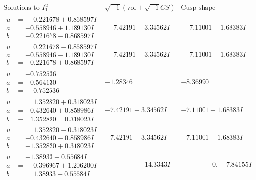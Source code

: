 \documentclass[1p]{elsarticle_modified}
\theoremstyle{definition}
\newcommand{\I}{\sqrt{-1}}
\begin{document}
$$\begin{array}{c|c|c}  
\text{Solutions to }I^u_{1}& \I (\text{vol} + \sqrt{-1}CS) & \text{Cusp shape}\\
 \hline 
\begin{aligned}
u &= \phantom{-}0.221678 + 0.868597 I \\
a &= -0.558946 + 1.189130 I \\
b &= -0.221678 - 0.868597 I\end{aligned}
 & \phantom{-}7.42191 + 3.34562 I & \phantom{-}7.11001 - 1.68383 I \\ \hline\begin{aligned}
u &= \phantom{-}0.221678 - 0.868597 I \\
a &= -0.558946 - 1.189130 I \\
b &= -0.221678 + 0.868597 I\end{aligned}
 & \phantom{-}7.42191 - 3.34562 I & \phantom{-}7.11001 + 1.68383 I \\ \hline\begin{aligned}
u &= -0.752536\phantom{ +0.000000I} \\
a &= -0.564130\phantom{ +0.000000I} \\
b &= \phantom{-}0.752536\phantom{ +0.000000I}\end{aligned}
 & -1.28346\phantom{ +0.000000I} & -8.36990\phantom{ +0.000000I} \\ \hline\begin{aligned}
u &= \phantom{-}1.352820 + 0.318023 I \\
a &= -0.432640 + 0.858986 I \\
b &= -1.352820 - 0.318023 I\end{aligned}
 & -7.42191 - 3.34562 I & -7.11001 + 1.68383 I \\ \hline\begin{aligned}
u &= \phantom{-}1.352820 - 0.318023 I \\
a &= -0.432640 - 0.858986 I \\
b &= -1.352820 + 0.318023 I\end{aligned}
 & -7.42191 + 3.34562 I & -7.11001 - 1.68383 I \\ \hline\begin{aligned}
u &= -1.38933 + 0.55684 I \\
a &= \phantom{-}0.396967 + 1.206200 I \\
b &= \phantom{-}1.38933 - 0.55684 I\end{aligned}
 & \phantom{-0.000000 -}14.3343 I & \phantom{-0.000000 } 0. - 7.84155 I \\ \hline\begin{aligned}

\end{aligned}
\end{array}$$
\end{document}

